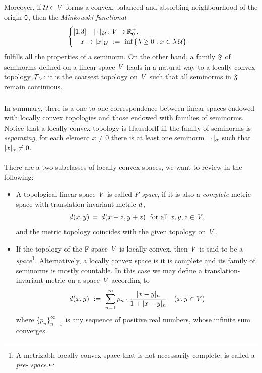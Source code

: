 \documentclass[11pt,twoside]{article}
\begin{document}
\subparagraph{} %
Moreover,
if $\mathcal{U} {\,\subset\,} \mathit{V}$ forms a convex, balanced and absorbing neighbourhood
of the origin ${\mathsf{0}}$,
then the \textit{Minkowski functional}
\[
\begin{cases}[1.3]
\quad \abs{\,\cdot\,} _{\,\U}\:\vecV \xto \R_0^+,\\
\quad x \mapsto \abs{x} _{\,\U} \, \eqdef \,
\mbox{inf} \, \{\lambda \geq 0: x \in \lambda \, \U\} \\
\end{cases}
\]
fulfills all the properties of a seminorm.
On the other hand,
a family $\mathfrak{F}$ of seminorms defined on a linear space $\mathit{V}$
leads in a natural way to a locally convex topology $\mathcal{T}_{\,\mathit{V}}$:
it is the coarsest topology on $\mathit{V}$
such that all seminorms in $\mathfrak{F}$ remain continuous.

\subparagraph{}
In summary,
there is a one-to-one correspondence
between linear spaces endowed with locally convex topologies
and those endowed with families of seminorms.
Notice that a locally convex topology is Hausdorff
iff
the family of seminorms is \textit{separating},
{\ie} for each element $x \neq 0$
there is at least one seminorm $\abs{\,\cdot\,} _{\alpha}$
such that $\abs{x} _{\alpha} \neq 0$.

\paragraph{} %
There are a two subclasses of locally convex spaces,
we want to review in the following:

\begin{itemize}[leftmargin=12pt,itemsep=5pt]
\item[1.]
A topological linear space $\mathit{V}$ is called \textit{F-space},
if it is also a \textit{complete} metric space with translation-invariant
metric $\mathit{d}$,
{\ie}
\[
\mathit{d}(x,y) \,=\, \mathit{d}(x+z,y+z) \; \mbox{ for all } x,y,z \in \mathit{V},
\]
and the metric topology coincides with the given topology on $\mathit{V}$.

\item[2.]
If the topology of the F-space $\mathit{V}$ is locally convex,
then $\mathit{V}$ is said to be a \textit{{\FRECHET} space}\footnote{
A metrizable locally convex space that is not necessarily complete,
is called a \textit{pre-{\FRECHET} space}.}.
Alternatively,
a locally convex space is {\FRECHET}
\iff
it is complete and its family of seminorms is mostly countable.
In this case
we may define a translation-invariant metric on a {\FRECHET} space $\mathit{V}$
according to
\[
\d(x,y) \, \eqdef \,
\sum_{n=1}^{\infty} p_n \cdot \frac{\abs{x-y} _n}{1+ \abs{x-y} _n}
\quad (x,y \in \topV)
\]
where $\{p_n\}_{n=1}^{\infty}$ is any sequence of positive real numbers,
whose infinite sum converges.
\end{itemize}
\end{document}
